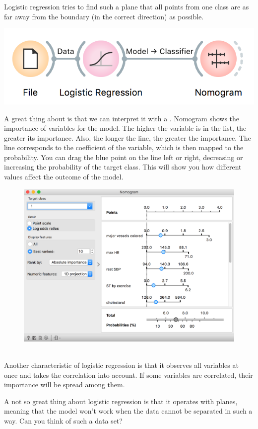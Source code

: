 Logistic regression tries to find such a plane that all points from one class are as far away from the boundary (in the correct direction) as possible.

\begin{marginfigure}
    \includegraphics[width=\textwidth]{workflow.png}%
    \label{fig:workflow}
  \end{marginfigure}

A great thing about  is that we can interpret it with a . Nomogram shows the importance of variables for the model. The higher the variable is in the list, the greater its importance. Also, the longer the line, the greater the importance. The line corresponds to the coefficient of the variable, which is then mapped to the probability. You can drag the blue point on the line left or right, decreasing or increasing the probability of the target class. This will show you how different values affect the outcome of the model.

\begin{figure}[h]
    \centering
    \includegraphics[scale=0.4]{nomogram.png}
    \caption{$\;$}
\end{figure}

Another characteristic of logistic regression is that it observes all variables at once and takes the correlation into account. If some variables are correlated, their importance will be spread among them.

A not so great thing about logistic regression is that it operates with planes, meaning that the model won't work when the data cannot be separated in such a way. Can you think of such a data set?
